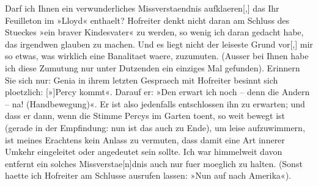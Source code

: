 \pstart
           Darf ich Ihnen ein verwunderliches Missverstaendnis aufklaeren{[},{]}
               das Ihr Feuilleton im »Lloyd« enthaelt? Hofreiter denkt nicht daran am Schluss des
                  Stueckes »ein braver Kindesvater« zu werden, so
               wenig ich daran gedacht habe, das irgendwen glauben zu machen. Und es liegt nicht der
               leiseste Grund vor{[},{]} mir so etwas, was wirklich eine Banalitaet waere, zuzumuten.
               (Ausser bei Ihnen habe ich diese Zumutung nur unter Dutzenden ein einziges Mal
               gefunden). Erinnern Sie sich nur: Genia in ihrem letzten Gespraech mit Hofreiter besinnt sich ploetzlich: {[}»{]}Percy kommt«. Darauf er: »Den erwart ich noch – denn die
                  Andern – na! (Handbewegung)«. Er ist also jedenfalls entschlossen ihn zu
               erwarten; und dass er dann, wenn die Stimme Percys im Garten toent, so weit bewegt ist (gerade in der Empfindung: nun
               ist das auch zu Ende), um leise aufzuwimmern, \label{T_L02949-1v}\label{T_L02949-1} ist meines Erachtens kein Anlass
               zu vermuten, dass damit eine Art innerer Umkehr eingeleitet oder angedeutet sein
               sollte. Ich war himmelweit davon entfernt ein solches
                  Missverstae{[}n{]}dnis auch nur fuer moeglich zu halten. (Sonst
               haette ich Hofreiter am
               Schlusse ausrufen lassen: »Nun auf nach Amerika«). \pend
           
